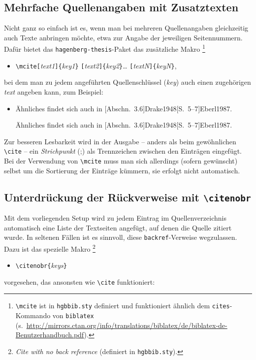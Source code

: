 \subsection{Mehrfache Quellenangaben mit Zusatztexten}

Nicht ganz so einfach ist es, wenn man bei mehreren Quellenangaben gleichzeitig auch Texte anbringen möchte, etwa zur
Angabe der jeweiligen Seitennummern. Dafür bietet das \texttt{hagenberg-thesis}-Paket das zusätzliche Makro%
\footnote{\texttt{\textbackslash mcite} ist in \texttt{hgbbib.sty} definiert und 
funktioniert ähnlich dem \texttt{{\bs}cites}-Kommando von \texttt{biblatex} 
(s.\ \url{http://mirrors.ctan.org/info/translations/biblatex/de/biblatex-de-Benutzerhandbuch.pdf}).}
%
\begin{itemize}
\item[] 
\verb!\mcite[!\textit{text1}\verb!]{!\textit{key1}\verb!}!%
      \verb![!\textit{text2}\verb!]{!\textit{key2}\verb!}!\ldots%
			\verb![!\textit{textN}\verb!]{!\textit{keyN}\verb!}!,
\end{itemize}
%
bei dem man zu jedem angeführten Quellenschlüssel (\textit{key}) auch einen zugehörigen \textit{text} angeben kann,
zum Beispiel:
%
\begin{itemize}
\item
Ähnliches findet sich auch in 
[Abschn.~3.6]{Drake1948}[S.~5--7]{Eberl1987}.
%
\begin{LaTeXCode}[numbers=none]
Ähnliches findet sich auch in
[Abschn.~3.6]{Drake1948}[S.~5--7]{Eberl1987}.
\end{LaTeXCode}
\end{itemize}
%
Zur besseren Lesbarkeit wird in der Ausgabe -- anders als beim gewöhnlichen \texttt{\textbackslash cite} -- ein
\emph{Strichpunkt} (;) als Trennzeichen zwischen den Einträgen eingefügt. Bei der Verwendung von
\texttt{\textbackslash mcite} muss man sich allerdings (sofern gewünscht) selbst um die Sortierung der Einträge
kümmern, sie erfolgt nicht automatisch.



\subsection{Unterdrückung der Rückverweise mit \texttt{\textbackslash citenobr}}

Mit dem vorliegenden Setup wird zu jedem Eintrag im Quellenverzeichnis automatisch eine Liste der Textseiten
angefügt, auf denen die Quelle zitiert wurde. In seltenen Fällen ist es sinnvoll, diese \texttt{backref}-Verweise
wegzulassen. Dazu ist das spezielle Makro%
\footnote{\emph{Cite with no back reference} (definiert in \texttt{hgbbib.sty}).}
\begin{itemize}
\item[] \verb!\citenobr{!\textit{keys}\verb!}! 
\end{itemize}
vorgesehen, das ansonsten wie \texttt{\textbackslash cite} funktioniert:
%




